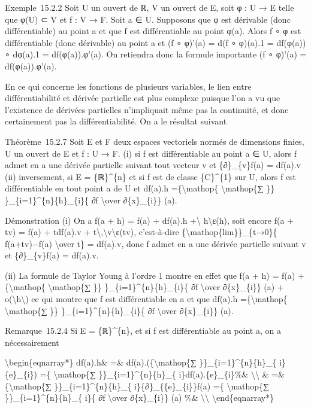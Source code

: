 \documentclass[]{article}
\begin{document}
Exemple~15.2.2 Soit U un ouvert de ℝ, V un ouvert de E, soit φ : U → E
telle que φ(U) ⊂ V et f : V → F. Soit a ∈ U. Supposons que φ est
dérivable (donc différentiable) au point a et que f est différentiable
au point φ(a). Alors f ∘ φ est différentiable (donc dérivable) au point
a et (f ∘ φ)'(a) = d(f ∘ φ)(a).1 = df(φ(a)) ∘ dφ(a).1 = df(φ(a)).φ'(a).
On retiendra donc la formule importante (f ∘ φ)'(a) = df(φ(a)).φ'(a).

En ce qui concerne les fonctions de plusieurs variables, le lien entre
différentiabilité et dérivée partielle est plus complexe puisque l'on a
vu que l'existence de dérivées partielles n'impliquait même pas la
continuité, et donc certainement pas la différentiabilité. On a le
résultat suivant

Théorème~15.2.7 Soit E et F deux espaces vectoriels normés de dimensions
finies, U un ouvert de E et f : U → F. (i) si f est différentiable au
point a ∈ U, alors f admet en a une dérivée partielle suivant tout
vecteur v et \{∂\}\_\{v\}f(a) = df(a).v (ii) inversement, si E =
\{ℝ\}\^{}\{n\} et si f est de classe \{C\}\^{}\{1\} sur U, alors f est
différentiable en tout point a de U et df(a).h
=\{\textbackslash{}mathop\{ \textbackslash{}mathop\{∑ \}\}
\}\_\{i=1\}\^{}\{n\}\{h\}\_\{i\}\{ ∂f \textbackslash{}over
∂\{x\}\_\{i\}\} (a).

Démonstration (i) On a f(a + h) = f(a) + df(a).h
+\textbackslash{}\textbar{} h\textbackslash{}\textbar{}ε(h), soit encore
f(a + tv) = f(a) + tdf(a).v +
\textbar{}t\textbar{}\textbackslash{},\textbackslash{}\textbar{}v\textbackslash{}\textbar{}ε(tv),
c'est-à-dire \{\textbackslash{}mathop\{lim\}\}\_\{t→0\}\{ f(a+tv)−f(a)
\textbackslash{}over t\} = df(a).v, donc f admet en a une dérivée
partielle suivant v et \{∂\}\_\{v\}f(a) = df(a).v.

(ii) La formule de Taylor Young à l'ordre 1 montre en effet que f(a + h)
= f(a) +\{\textbackslash{}mathop\{ \textbackslash{}mathop\{∑ \}\}
\}\_\{i=1\}\^{}\{n\}\{h\}\_\{i\}\{ ∂f \textbackslash{}over
∂\{x\}\_\{i\}\} (a) +
o(\textbackslash{}\textbar{}h\textbackslash{}\textbar{}) ce qui montre
que f est différentiable en a et que df(a).h =\{\textbackslash{}mathop\{
\textbackslash{}mathop\{∑ \}\} \}\_\{i=1\}\^{}\{n\}\{h\}\_\{i\}\{ ∂f
\textbackslash{}over ∂\{x\}\_\{i\}\} (a).

Remarque~15.2.4 Si E = \{ℝ\}\^{}\{n\}, et si f est différentiable au
point a, on a nécessairement

\textbackslash{}begin\{eqnarray*\} df(a).h\& =\&
df(a).(\{\textbackslash{}mathop\{∑ \}\}\_\{i=1\}\^{}\{n\}\{h\}\_\{
i\}\{e\}\_\{i\}) =\{ \textbackslash{}mathop\{∑
\}\}\_\{i=1\}\^{}\{n\}\{h\}\_\{ i\}df(a).\{e\}\_\{i\}\%\&
\textbackslash{}\textbackslash{} \& =\& \{\textbackslash{}mathop\{∑
\}\}\_\{i=1\}\^{}\{n\}\{h\}\_\{ i\}\{∂\}\_\{\{e\}\_\{i\}\}f(a) =\{
\textbackslash{}mathop\{∑ \}\}\_\{i=1\}\^{}\{n\}\{h\}\_\{ i\}\{ ∂f
\textbackslash{}over ∂\{x\}\_\{i\}\} (a) \%\&
\textbackslash{}\textbackslash{} \textbackslash{}end\{eqnarray*\}
\end{document}
